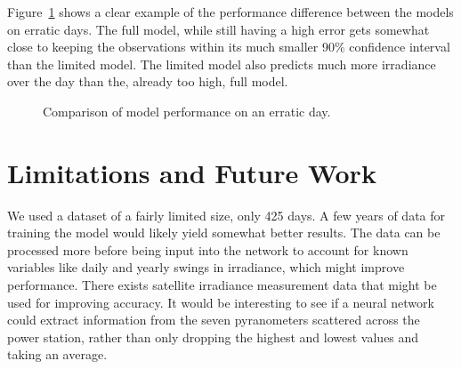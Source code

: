 Figure~\ref{fig:disc_high} shows a clear example of the performance difference between the models on erratic days. The full model, while still having a high error gets somewhat close to keeping the observations within its much smaller 90\% confidence interval than the limited model. The limited model also predicts much more irradiance over the day than the, already too high, full model.
\begin{figure}[ht!]
    \centering
    \qquad
    \qquad
    \caption{Comparison of model performance on an erratic day.
    \label{fig:disc_high}}
\end{figure}



\section{Limitations and Future Work}
We used a dataset of a fairly limited size, only 425 days. A few years of data for training the model would likely yield somewhat better results. The data can be processed more before being input into the network to account for known variables like daily and yearly swings in irradiance, which might improve performance. There exists satellite irradiance measurement data that might be used for improving accuracy. It would be interesting to see if a neural network could extract information from the seven pyranometers scattered across the power station, rather than only dropping the highest and lowest values and taking an average. 

